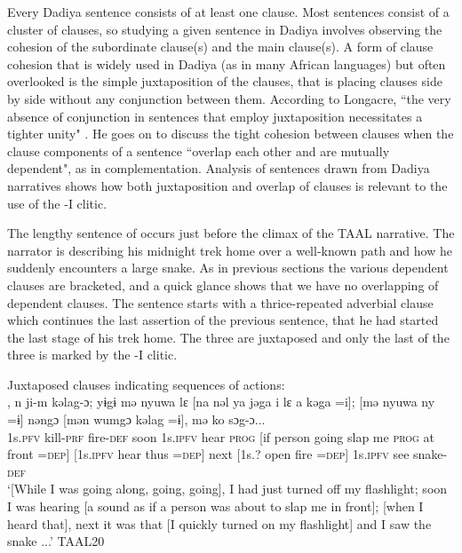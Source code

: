 \documentclass[output=paper]{langscibook}
\begin{document}
Every Dadiya sentence consists of at least one clause. Most sentences consist of a cluster of clauses, so studying a given sentence in Dadiya involves observing the cohesion of the subordinate clause(s) and the main clause(s). A form of clause cohesion that is widely used in Dadiya (as in many African languages) but often overlooked is the simple juxtaposition of the clauses, that is placing clauses side by side without any conjunction between them. According to Longacre, ``the very absence of conjunction in sentences that employ juxtaposition necessitates a tighter unity" \citeyearpar[376]{Longacre2007}. He goes on to discuss the tight cohesion between clauses when the clause components of a sentence ``overlap each other and are mutually dependent", as in complementation. Analysis of sentences drawn from Dadiya narratives shows how both juxtaposition and overlap of clauses is relevant to the use of the -I clitic.

The lengthy sentence of  occurs just before the climax of the TAAL narrative. The narrator is describing his midnight trek home over a well-known path and how he suddenly encounters a large snake. As in previous sections the various dependent clauses are bracketed, and a quick glance shows that we have no overlapping of dependent clauses. The sentence starts with a thrice-repeated adverbial clause which continues the last assertion of the previous sentence, that he had started the last stage of his trek home. The three are juxtaposed and only the last of the three is marked by the -I clitic.

\ea Juxtaposed clauses indicating sequences of actions:
\label{ex:dettweiler:TAAL20} \\
\gll [Mə yɔ lɛ mə yɔ lɛ mə yɔ lɛ =i], n ji-m kəlag-ɔ; yɨgɨ mə nyuwa lɛ [na nəl ya jəga i lɛ a kəga =i]; [mə nyuwa ny =ɨ] nəngɔ [mən wumgɔ kəlag =ɨ], mə ko sɔg-ɔ... \\
[1s.\textsc{ipfv} go \textsc{prog} 1s.\textsc{ipfv} go \textsc{prog} 1s.\textsc{ipfv} go \textsc{prog} =\textsc{dep}] 1s.\textsc{pfv} kill-\textsc{prf} fire-\textsc{def} soon 1s.\textsc{ipfv} hear \textsc{prog} [if person going slap me \textsc{prog} at front =\textsc{dep}] [1s.\textsc{ipfv} hear thus =\textsc{dep}] next [1s.? open fire =\textsc{dep}] 1s.\textsc{ipfv} see snake-\textsc{def} \\
\glt `[While I was going along, going, going], I had just turned off my flashlight; soon I was hearing [a sound as if a person was about to slap me in front]; [when I heard that], next it was that [I quickly turned on my flashlight] and I saw the snake ...' TAAL20
\z
\end{document}
